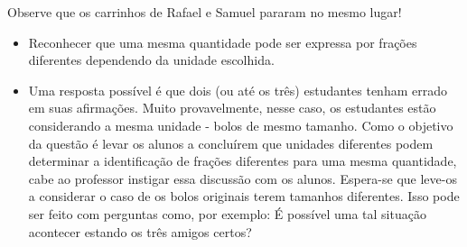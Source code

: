 \begin{multicols}{2}
\begin{solucao}{}{}
\begin{center}
\end{center}


Observe que os carrinhos de Rafael e Samuel pararam no mesmo lugar!
\end{solucao}

\begin{objetivos}[label=chap2-ativ13]{}{}

\begin{itemize} %
    \item Reconhecer que uma mesma quantidade pode ser expressa por frações diferentes dependendo da unidade escolhida.
\end{itemize} %
\end{objetivos}

\begin{orientacoes}

  \begin{itemize} %
  \item Uma resposta possível é que dois (ou até os três) estudantes tenham errado em suas afirmações.    Muito provavelmente, nesse caso, os estudantes estão considerando a mesma unidade - bolos de mesmo tamanho. 
Como o objetivo da questão é levar os alunos a concluírem que unidades diferentes podem determinar a identificação de frações diferentes para uma mesma quantidade, cabe ao professor instigar essa discussão com os alunos. Espera-se que leve-os a considerar o caso de os bolos originais terem tamanhos diferentes. Isso pode ser feito com perguntas como, por exemplo: É possível uma tal situação acontecer estando os três amigos certos?


\end{itemize}
\end{orientacoes}
\end{multicols}
